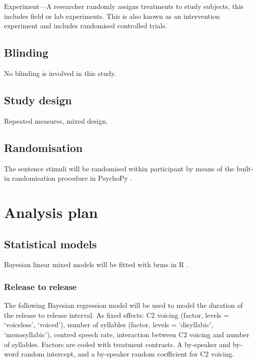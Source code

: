 \documentclass[11pt,]{article}
\begin{document}
Experiment---A researcher randomly assigns treatments to study subjects,
this includes field or lab experiments. This is also known as an
intervention experiment and includes randomised controlled trials.

\subsection{Blinding}\label{blinding}

No blinding is involved in this study.

\subsection{Study design}\label{study-design}

Repeated measures, mixed design.

\subsection{Randomisation}\label{randomisation}

The sentence stimuli will be randomised within participant by means of
the built-in randomisation procedure in PsychoPy \citep{peirce2009}.

\section{Analysis plan}\label{analysis-plan}

\subsection{Statistical models}\label{statistical-models}

\label{s:stats}

Bayesian linear mixed models
\citep{vasishth2018, mcelreath2015, kruschke2015} will be fitted with
brms \citep{burkner2017, burkner2018} in R \citep{r-core-team2018}.

\subsubsection{Release to release}\label{release-to-release}

The following Bayesian regression model will be used to model the
duration of the release to release interval. As fixed effects: C2
voicing (factor, levels = `voiceless', `voiced'), number of syllables
(factor, levels = `disyllabic', `monosyllabic'), centred speech rate,
interaction between C2 voicing and number of syllables. Factors are
coded with treatment contrasts. A by-speaker and by-word random
intercept, and a by-speaker random coefficient for C2 voicing.
\end{document}
